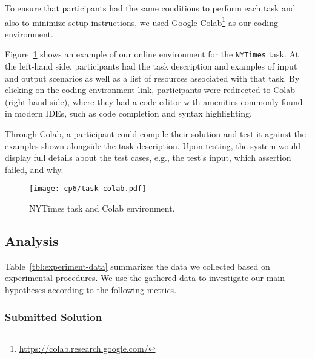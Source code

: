 {To ensure that participants had the same conditions to perform each task
and also to minimize setup instructions, we used Google Colab\footnote{\url{https://colab.research.google.com/}} as our coding environment. 



Figure~\ref{fig:nytimes-task-colab} shows an example of our online environment for the \texttt{NYTimes} task.
At the left-hand side, participants had the task description and examples of input and output scenarios as well as a list of resources associated with that task. 
By clicking on the coding environment link, participants were redirected to Colab (right-hand side),
where they had a code editor with amenities commonly found in modern IDEs, such as code completion and syntax highlighting. 



Through Colab, a participant could compile their solution and test it against the examples shown alongside the task description.
Upon testing, the system would display full details about the test cases, e.g., the test's input, which assertion failed, and why. 




\clearpage

\begin{landscape}
\begin{figure}
    \centering
    \texttt{[image: cp6/task-colab.pdf]}
    \caption{NYTimes task and Colab environment.}
    \label{fig:nytimes-task-colab}
\end{figure}
\end{landscape}

\clearpage


\subsection{Analysis}



Table~\ref{tbl:experiment-data} summarizes the data we collected based on experimental procedures.
We use the gathered data to investigate our main hypotheses according to the following metrics.






\subsubsection{Submitted Solution}

}
